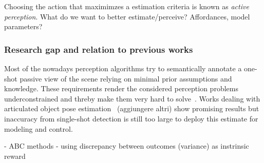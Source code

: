 Choosing the action that maximimzes a estimation criteria is known as \emph{active perception}. 
What do we want to better estimate/perceive? Affordances, model parameters?
 
\subsubsection{Research gap and relation to previous works}
Most of the nowadays perception algorithms try to semantically annotate a one-shot passive view of the scene relying on minimal prior assumptions and knowledge. These requirements render the considered perception problems underconstrained and threby make them very hard to solve~\cite{bohg2017interactive}.   
Works dealing with articulated object pose estimation~\cite{li2020category} (aggiungere altri) show promising results but inaccuracy from single-shot detection is still too large to deploy this estimate for modeling and control. 

- ABC methods 
- \cite{pathak2019self} using discrepancy between outcomes (variance) as instrinsic reward